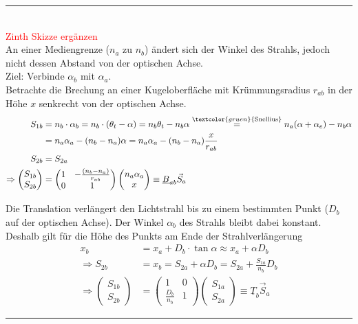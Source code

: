 \documentclass{article}
\newcommand{\commenttext}[1]{\textcolor{gruen}{\text{#1}}}
\begin{document}
{\color{violet}
\hrule
	\\
	\textcolor{red}{Zinth Skizze ergänzen}\\
	An einer Mediengrenze ($n_a$ zu $n_b$) ändert sich der Winkel des Strahls, jedoch nicht dessen Abstand von der optischen Achse.\\
	Ziel: Verbinde $\alpha_b$ mit $\alpha_a$.\\
	Betrachte die Brechung an einer Kugeloberfläche mit Krümmungsradius $r_{ab}$ in der Höhe $x$ senkrecht von der optischen Achse.
		\begin{align*}
			S_{1b} &= n_b\cdot \alpha_b = n_b \cdot (\theta_t - \alpha) = n_b \theta_t - n_b \alpha \stackrel{\commenttext{Snellius}}{=} n_a (\alpha + \alpha_e) - n_b \alpha \\
			&= n_a \alpha_a - (n_b - n_a)\alpha = n_a \alpha_a - (n_b - n_a) \frac{x}{r_{ab}} \\
			S_{2b} &= S_{2a} \\
			\Rightarrow
			\begin{pmatrix}
				S_{1b} \\ S_{2b}
			\end{pmatrix}
			&=
			\begin{pmatrix}
				1 & -\frac{(n_b - n_a)}{r_{ab}} \\
				0 & 1
			\end{pmatrix}
			\begin{pmatrix}
				n_a \alpha_a \\ x
			\end{pmatrix}
			\equiv \underline{B}_{ab} \vec{S}_a
		\end{align*}
	
	\dotfill
	
	Die Translation verlängert den Lichtstrahl bis zu einem bestimmten Punkt ($D_b$ auf der optischen Achse). Der Winkel $\alpha_b$ des Strahls bleibt dabei konstant. Deshalb gilt für die Höhe des Punkts am Ende der Strahlverlängerung
		\begin{align*}
			x_b &= x_a + D_b \cdot \tan\alpha \approx x_a + \alpha D_b \\
			\Rightarrow S_{2b} &= x_b = S_{2a} + \alpha D_b = S_{2a} + \frac{S_{1a}}{n_b} D_b \\
			\Rightarrow
			\begin{pmatrix}
				S_{1b} \\ S_{2b}
			\end{pmatrix}
			&=
			\begin{pmatrix}
				1 & 0 \\
				\frac{D_b}{n_b} & 1
			\end{pmatrix}
			\begin{pmatrix}
				S_{1a} \\ S_{2a}
			\end{pmatrix}
			\equiv \underline{T}_b \vec{S}_a
		\end{align*}
\hrule
}
\end{document}
